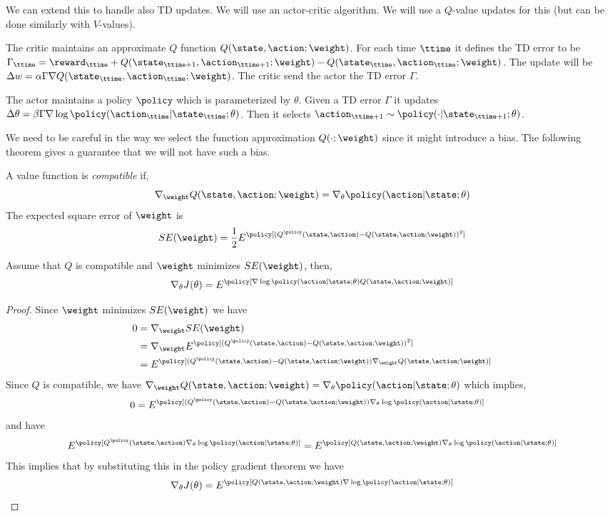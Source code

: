 We can extend this to handle also TD updates. We will use an
actor-critic algorithm. We will use a $Q$-value updates for this
(but can be done similarly with $V$-values).

The critic maintains an approximate $Q$ function
$Q(\state,\action;\weight)$. For each time $\ttime$ it defines the
TD error to be $\Gamma_\ttime = \reward_\ttime
+Q(\state_{\ttime+1},\action_{\ttime+1};\weight)-Q(\state_\ttime,\action_\ttime;\weight)$.
The update will be $\Delta w=\alpha\Gamma \nabla
Q(\state_\ttime,\action_\ttime;\weight)$. The critic send the actor
the TD error $\Gamma$.

The actor maintains a policy $\policy$ which is parameterized by
$\theta$. Given a TD error $\Gamma$ it updates $\Delta \theta= \beta
\Gamma \nabla \log \policy(\action_\ttime|\state_\ttime;\theta)$.
Then it selects $\action_{\ttime+1}\sim
\policy(\cdot|\state_{\ttime+1};\theta)$.

We need to be careful in the way we select the function
approximation $Q(\cdot;\weight)$ since it might introduce a bias.
The following theorem gives a guarantee that we will not have such a
bias.

A value function is {\em compatible} if,
\[
\nabla_\weight Q(\state,\action;\weight)= \nabla_\theta
\policy(\action|\state;\theta)
\]
The expected square error of $\weight$ is
\[
SE(\weight)=\frac{1}{2}E^\policy[(Q^\policy(\state,\action)-Q(\state,\action;\weight))^2]
\]

\begin{theorem}
Assume that $Q$ is compatible and $\weight$ minimizes $SE(\weight)$,
then,
\[
\nabla_\theta J(\theta)=E^\policy[\nabla \log
\policy(\action|\state;\theta)Q(\state,\action;\weight)]
\]
\end{theorem}

\begin{proof}
Since $\weight$ minimizes $SE(\weight)$ we have
\begin{align*}
0 & = \nabla_\weight SE(\weight)\\
&= \nabla_\weight E^\policy[(Q^\policy(\state,\action)-Q(\state,\action;\weight))^2]\\
&=
E^\policy[(Q^\policy(\state,\action)-Q(\state,\action;\weight))\nabla_\weight
Q(\state,\action;\weight)]
\end{align*}
Since $Q$ is compatible, we have $\nabla_\weight
Q(\state,\action;\weight)= \nabla_\theta
\policy(\action|\state;\theta)$ which implies,
\begin{align*}
0&=
E^\policy[(Q^\policy(\state,\action)-Q(\state,\action;\weight))\nabla_\theta
\log \policy(\action|\state;\theta)]
\end{align*}
and have
\begin{align*}
 E^\policy[Q^\policy(\state,\action)\nabla_\theta \log \policy(\action|\state;\theta)] = E^\policy[Q(\state,\action;\weight)\nabla_\theta \log \policy(\action|\state;\theta)]
\end{align*}
This implies that by substituting this in the policy gradient
theorem we have
\[
\nabla_\theta J(\theta)=E^\policy[Q(\state,\action;\weight) \nabla
\log \policy(\action|\state;\theta)]
\]
\end{proof}


